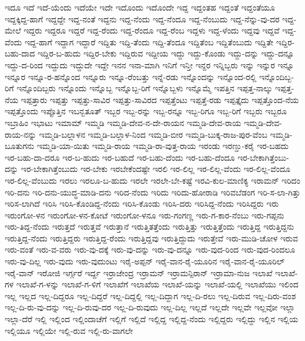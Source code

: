 ಇದೂ
ಇದೆ
ಇದೆ-ಯೆಂದು
ಇದೆಯೇ
ಇದೇ
ಇದೊಂದು
ಇದೊಂದೇ
ಇದ್ದ
ಇದ್ದಂತಹ
ಇದ್ದಂತೆ
ಇದ್ದಂತೆಯೂ
ಇದ್ದಕ್ಕಿದ್ದ-ಹಾಗೆ
ಇದ್ದದ್ದೇ
ಇದ್ದ-ನಂತೆ
ಇದ್ದನು
ಇದ್ದ-ನೆಂದು
ಇದ್ದ-ನೆಂದೂ
ಇದ್ದ-ನೆಂಬುದು
ಇದ್ದ-ನೆನ್ನು-ವು-ದರ
ಇದ್ದ-ಮೇಲೆ
ಇದ್ದರು
ಇದ್ದರೂ
ಇದ್ದರೆ
ಇದ್ದ-ರೆಂದು
ಇದ್ದ-ರೆಂದೂ
ಇದ್ದ-ರೆಂಬ
ಇದ್ದಳು
ಇದ್ದ-ಳೆಂದು
ಇದ್ದವು
ಇದ್ದವೆ
ಇದ್ದ-ವೆಂದು
ಇದ್ದ-ಹಾಗೆ
ಇದ್ದಾಗ
ಇದ್ದಾರೆ
ಇದ್ದಿತು
ಇದ್ದಿ-ತೆಂದು
ಇದ್ದಿ-ತೆಂದೂ
ಇದ್ದಿತೆಂಬ
ಇದ್ದಿತೆಂಬುದು
ಇದ್ದಿತೇ
ಇದ್ದಿರ-ಬಹು-ದಾದ
ಇದ್ದಿರ-ಬ-ಹುದು
ಇದ್ದಿರ-ಬೇಕು
ಇದ್ದಿರುವ
ಇದ್ದೀಯ
ಇದ್ದು
ಇದ್ದು-ಕೊಂಡು
ಇದ್ದು-ದನ್ನು
ಇದ್ದು-ದನ್ನೂ
ಇದ್ದು-ದ-ರಿಂದ
ಇದ್ದುದು
ಇದ್ದುದೇ
ಇದ್ದೇ
ಇನನ
ಇನಾ-ಮಾಗಿ
ಇನಿಗೆ
ಇನ್ತೀ
ಇನ್ದರ
ಇನ್ನಿಬ್ಬರು
ಇನ್ನು
ಇನ್ನುರ
ಇನ್ನೂ
ಇನ್ನೂರ
ಇನ್ನೂ-ರ-ಹನ್ನೊಂದ
ಇನ್ನೂರು
ಇನ್ನೂ-ರೆಂಬತ್ತು
ಇನ್ನೆ-ರಡು
ಇನ್ನೊಂದನ್ನು
ಇನ್ನೊಂದ-ರಲ್ಲಿ
ಇನ್ನೊಂದಿಬ್ಬ-ರಿಗೆ
ಇನ್ನೊಂದಿಬ್ಬರು
ಇನ್ನೊಂದು
ಇನ್ನೊಬ್ಬ
ಇನ್ನೊಬ್ಬ-ರಿಗೆ
ಇನ್ನೊಬ್ಬಳು
ಇನ್ನೊಮ್ಮೆ
ಇಪತ್ತಿನ
ಇಪ್ಪತ್ತ-ನಾಲ್ಕು
ಇಪ್ಪತ್ತ-ನೆಯ
ಇಪ್ಪತ್ತಾರು
ಇಪ್ಪತ್ತು
ಇಪ್ಪತ್ತು-ಸಾವಿರ
ಇಪ್ಪತ್ತು-ಸಾವಿರದ
ಇಪ್ಪತ್ತೆಂಟು
ಇಪ್ಪತ್ತೆ-ರಡು
ಇಪ್ಪತ್ತೈದು
ಇಪ್ಪತ್ತೊಂದ-ನೆಯ
ಇಪ್ಪತ್ತೊಂದು
ಇಪ್ಪೊತ್ತಿನ
ಇಬನ್ಬತೂತ್
ಇಬ್ಬರ
ಇಬ್ಬ-ರನ್ನು
ಇಬ್ಬ-ರನ್ನೂ
ಇಬ್ಬ-ರಿಗೂ
ಇಬ್ಬ-ರಿಗೆ
ಇಬ್ಬರು
ಇಬ್ಬರೂ
ಇಬ್ರಾಹಿಂ
ಇಭಾಟು
ಇಮಾಮ್
ಇಮ್ಮಡಿ
ಇಮ್ಮಡಿ-ದೇವ-ನ-ದೇ-ರಾಯನ
ಇಮ್ಮಡಿ-ದೇವ-ರಾಯ
ಇಮ್ಮಡಿ-ದೇವ-ರಾಯ-ನನ್ನು
ಇಮ್ಮಡಿ-ಬಲ್ಲಾಳನ
ಇಮ್ಮಡಿ-ಬಲ್ಲಾಳ-ನಿಂದ
ಇಮ್ಮಡಿ-ಬೀರ
ಇಮ್ಮಡಿ-ಬುಕ್ಕ-ರಾಜ-ಪುರ-ವೆಂಬ
ಇಮ್ಮಡಿ-ಬೂತುಗನು
ಇಮ್ಮಡಿ-ಯಾ-ಯಿತು
ಇಮ್ಮಡಿ-ರಾಯ
ಇಮ್ಮಡಿ-ರಾ-ವುತ್ತ-ರಾಯ
ಇರಂಡು
ಇರಣ್ಡು-ಕರೈ
ಇರ-ಬಹದು
ಇರ-ಬಹು-ದಾ-ದರೂ
ಇರ-ಬ-ಹುದು
ಇರ-ಬಹುದೆ
ಇರ-ಬಹು-ದೆಂದು
ಇರ-ಬಹು-ದೆಂದೂ
ಇರ-ಬೇಕಾಗಿತ್ತೆಂಬು-ದನ್ನು
ಇರ-ಬೇಕಾಗಿತ್ತೆಂಬುದು
ಇರ-ಬೇಕು
ಇರಬೇಕೆಂದಷ್ಟೇ
ಇರಲಿ
ಇರ-ಲಿಲ್ಲ
ಇರ-ಲಿಲ್ಲ-ವೆಂದು
ಇರ-ಲಿಲ್ಲ-ವೆಂದೂ
ಇರ-ಲಿಲ್ಲ-ವೆಂಬುದು
ಇರಲು
ಇರಲೂ-ಬ-ಹುದು
ಇರಲೇ
ಇರಲೇ-ಬೇ-ಕಷ್ಟೆ
ಇರವಿ-ಕುಲ-ಮಾಣಿಕ್ಯ
ಇರಾಮನ್
ಇರಿದಂ
ಇರಿ-ದನು
ಇರಿ-ದನು-ಯುದ್ಧ-ಮಾಡಿ-ದನು
ಇರಿದ-ನೆಂದು
ಇರಿದು
ಇರಿದು-ಹೋರಾಡಿ
ಇರಿವಬೆಡಂಗ
ಇರಿ-ಸ-ಲಾ-ಗಿತ್ತು
ಇರಿಸ-ಲಾಗಿದೆ
ಇರಿಸಿ
ಇರಿಸಿ-ಕೊಂಡಿದ್ದ-ನೆಂದು
ಇರಿಸಿ-ಕೊಂಡು
ಇರಿಸಿ-ದರು
ಇರಿಸಿದ್ದ-ನೆಂದು
ಇರಿಸಿದ್ದರು
ಇರು
ಇರುಂಗೋ-ಳನ
ಇರುಂಗೋ-ಳನ-ಕೋಟೆ
ಇರುಂಗೋ-ಳನೂ
ಇರು-ಗಂಗಣ್ಣ
ಇರು-ಗ-ಕಾರ-ನೆಂಬು
ಇರು-ಗಪ್ಪನು
ಇರು-ತಿದ್ದ-ನೆಂದು
ಇರುತ್ತದೆ
ಇರುತ್ತವೆ
ಇರುತ್ತಾನೆ
ಇರುತ್ತಿತತ್ತೆಂದು
ಇರುತ್ತಿತ್ತು
ಇರುತ್ತಿತ್ತೆಂದು
ಇರುತ್ತಿದ್ದ
ಇರುತ್ತಿದ್ದನು
ಇರುತ್ತಿದ್ದ-ನೆಂದು
ಇರುತ್ತಿದ್ದರು
ಇರುತ್ತಿದ್ದ-ರೆಂದು
ಇರುತ್ತಿದ್ದವು
ಇರುತ್ತಿದ್ದುದು
ಇರುತ್ತೇವೆ
ಇರು-ಮುಡಿ-ಚೋಳ
ಇರುವ
ಇರು-ವಂತೆ
ಇರು-ವ-ವರು
ಇರು-ವು-ದಕ್ಕೆ
ಇರು-ವು-ದನ್ನು
ಇರು-ವು-ದನ್ನೂ
ಇರು-ವುದ-ರಿಂದ
ಇರು-ವುದ-ರಿಂದಲೂ
ಇರು-ವು-ದಿಲ್ಲ
ಇರು-ವುದು
ಇರು-ವುದುಂಟು
ಇರೈ-ಅಪ್ಪನ್
ಇರೈ-ವಾನ-ರೈ-ಯೂರಿನ
ಇರೈ-ವಾನ-ರೈ-ಯೂರಿಲ್
ಇರೈ-ವಾನ್
ಇರೋಜಿ
ಇರ್ಗ್ಗರೆ
ಇರ್ದ್ದ
ಇರ್ರಾಜೇಂದ್ರ
ಇರ್ರಾಮನ್
ಇರ್ರಾಮನ್ಪಿರಾನ್
ಇರ್ರಾಮಾ-ನುಜ
ಇಲಾಖೆ
ಇಲಾಖೆ-ಗಳ
ಇಲಾಖೆ-ಗ-ಳನ್ನು
ಇಲಾಖೆ-ಗ-ಳಿಗೆ
ಇಲಾಖೆಗೆ
ಇಲಾಖೆಯ
ಇಲಾಖೆ-ಯನ್ನು
ಇಲಾಖೆ-ಯಲ್ಲಿ
ಇಲಾಖೆಯು
ಇಲಿಂದ
ಇಲ್ಲ
ಇಲ್ಲದ
ಇಲ್ಲ-ದಿದ್ದರೂ
ಇಲ್ಲ-ದಿದ್ದರೆ
ಇಲ್ಲ-ದಿದ್ದಲ್ಲಿ
ಇಲ್ಲ-ದಿದ್ದಾಗ
ಇಲ್ಲ-ದಿ-ರಲು
ಇಲ್ಲ-ದಿರುವ
ಇಲ್ಲ-ದಿರು-ವಂಶ
ಇಲ್ಲ-ದಿ-ರು-ವು-ದನ್ನು
ಇಲ್ಲ-ದಿ-ರುವು-ದರ
ಇಲ್ಲ-ದಿ-ರುವುದು
ಇಲ್ಲ-ದಿಲ್ಲ
ಇಲ್ಲದೆ
ಇಲ್ಲದೇ
ಇಲ್ಲವೇ
ಇಲ್ಲವೋ
ಇಲ್ಲಾ
ಇಲ್ಲಾ-ದೆರೆ
ಇಲ್ಲಿ
ಇಲ್ಲಿಂದ
ಇಲ್ಲಿಂದಾಚೆಗೆ
ಇಲ್ಲಿಗೆ
ಇಲ್ಲಿದೆ
ಇಲ್ಲಿದ್ದ
ಇಲ್ಲಿದ್ದ-ನೆಂದು
ಇಲ್ಲಿದ್ದರು
ಇಲ್ಲಿದ್ದು
ಇಲ್ಲಿನ
ಇಲ್ಲಿಯ
ಇಲ್ಲಿಯೂ
ಇಲ್ಲಿಯೇ
ಇಲ್ಲಿ-ರುವ
ಇಲ್ಲಿ-ರು-ವಾಗಲೇ
